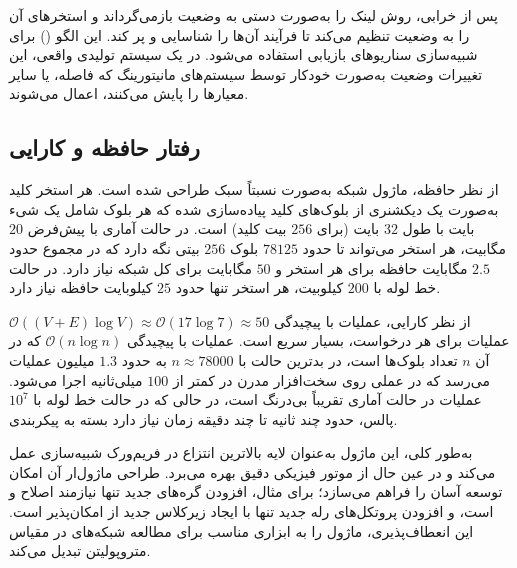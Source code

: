 پس از خرابی، روش  لینک  را به‌صورت دستی به وضعیت  بازمی‌گرداند و استخرهای آن را به وضعیت  تنظیم می‌کند تا فرآیند  آن‌ها را شناسایی و پر کند. این الگو () برای شبیه‌سازی سناریوهای بازیابی استفاده می‌شود. در یک سیستم تولیدی واقعی، این تغییرات وضعیت به‌صورت خودکار توسط سیستم‌های مانیتورینگ که فاصله،  یا سایر معیارها را پایش می‌کنند، اعمال می‌شوند.

\subsection{رفتار حافظه و کارایی}

از نظر حافظه، ماژول شبکه به‌صورت نسبتاً سبک طراحی شده است. هر استخر کلید به‌صورت یک دیکشنری از بلوک‌های کلید پیاده‌سازی شده که هر بلوک شامل یک شیء بایت با طول $32$ بایت (برای $256$ بیت کلید) است. در حالت آماری با  پیش‌فرض $20$ مگابیت، هر استخر می‌تواند تا حدود $78125$ بلوک $256$ بیتی نگه دارد که در مجموع حدود $2.5$ مگابایت حافظه برای هر استخر و $50$ مگابایت برای کل شبکه نیاز دارد. در حالت خط لوله با  $200$ کیلوبیت، هر استخر تنها حدود $25$ کیلوبایت حافظه نیاز دارد.

از نظر کارایی، عملیات  با پیچیدگی $\mathcal{O}((V+E) \log V) \approx \mathcal{O}(17 \log 7) \approx 50$ عملیات برای هر درخواست، بسیار سریع است. عملیات  با پیچیدگی $\mathcal{O}(n \log n)$ که در آن $n$ تعداد بلوک‌ها است، در بدترین حالت با $n \approx 78000$ به حدود $1.3$ میلیون عملیات می‌رسد که در عملی روی سخت‌افزار مدرن در کمتر از $100$ میلی‌ثانیه اجرا می‌شود. عملیات  در حالت آماری تقریباً بی‌درنگ است، در حالی که در حالت خط لوله با $10^7$ پالس، حدود چند ثانیه تا چند دقیقه زمان نیاز دارد بسته به پیکربندی.

به‌طور کلی، این ماژول به‌عنوان لایه بالاترین انتزاع در فریم‌ورک شبیه‌سازی  عمل می‌کند و در عین حال از موتور فیزیکی دقیق بهره می‌برد. طراحی ماژول‌ار آن امکان توسعه آسان را فراهم می‌سازد؛ برای مثال، افزودن گره‌های جدید تنها نیازمند اصلاح  و  است، و افزودن پروتکل‌های رله جدید تنها با ایجاد زیرکلاس جدید از  امکان‌پذیر است. این انعطاف‌پذیری، ماژول را به ابزاری مناسب برای مطالعه شبکه‌های  در مقیاس متروپولیتن تبدیل می‌کند.
